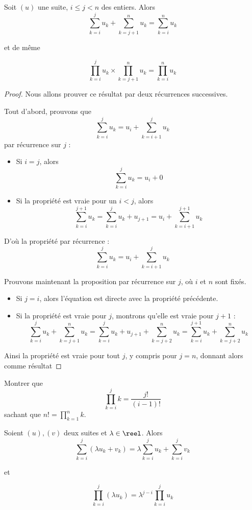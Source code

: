 \begin{prop}[Recollement]\label{recollement}
    Soit $(u)$ une suite, $i\leq j< n$ des entiers. Alors $$\sum_{k=i}^j u_k + \sum_{k=j+1}^n u_k = \sum_{k=i}^n u_k$$ \begin{center} et de même\end{center} $$\prod_{k=i}^j u_k \times \prod_{k=j+1}^n u_k = \prod_{k=i}^n u_k$$
\end{prop}
\begin{proof}
    Nous allons prouver ce résultat par deux récurrences successives.
    
    Tout d'abord, prouvons que $$\sum_{k=i}^j u_k = u_i + \sum_{k=i+1}^j u_k$$ par récurrence sur $j$ :
    \begin{itemize}[label=$\bullet$]
        \item Si $i=j$, alors $$\sum_{k=i}^j u_k = u_i + 0$$
        \item Si la propriété est vraie pour un $i<j$, alors $$\sum_{k=i}^{j+1}u_k=\sum_{k=i}^j u_k + u_{j+1}=u_i+\sum_{k=i+1}^{j+1}u_k$$
    \end{itemize}
    D'où la propriété par récurrence : $$\sum_{k=i}^j u_k = u_i + \sum_{k=i+1}^j u_k$$
    
    Prouvons maintenant la proposition par récurrence sur $j$, où $i$ et $n$ sont fixés.
    \begin{itemize}[label=$\bullet$]
        \item Si $j=i$, alors l'équation est directe avec la propriété précédente.
        \item Si la propriété est vraie pour $j$, montrons qu'elle est vraie pour $j+1$ : $$\sum_{k=i}^j u_k + \sum_{k=j+1}^n u_k = \sum_{k=i}^j u_k +u_{j+1} + \sum_{k=j+2}^n u_k = \sum_{k=i}^{j+1} u_k + \sum_{k=j+2}^n u_k $$
    \end{itemize}
    Ainsi la propriété est vraie pour tout $j$, y compris pour $j=n$, donnant alors comme résultat 
\end{proof}

\begin{exo}
    Montrer que $$\prod_{k=i}^j k =\dfrac{j!}{(i-1)!}$$ sachant que $n!=\prod_{k=1}^n k$.
\end{exo}

\begin{prop}
    Soient $(u),(v)$ deux suites et $\lambda \in\reel$. Alors
    $$\sum_{k=i}^j (\lambda u_k + v_k) = \lambda \sum_{k=i}^j u_k + \sum_{k=i}^j v_k$$ \begin{center} et \end{center} $$\prod_{k=i}^j (\lambda u_k) = \lambda ^{j-i}\prod_{k=i}^j u_k$$
\end{prop}

